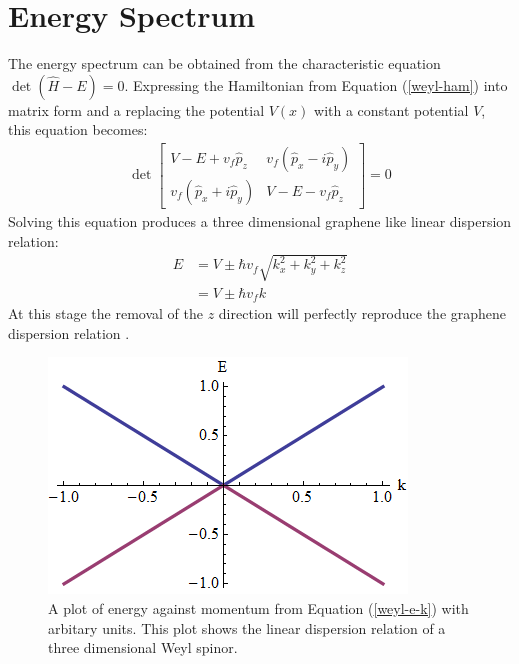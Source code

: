 		\section{Energy Spectrum}
			The energy spectrum can be obtained from the characteristic equation $\det\left(\hat{H}-E\right)=0$. Expressing the Hamiltonian from Equation (\ref{weyl-ham}) into matrix form and a replacing the potential $V\left( x\right)$ with a constant potential $V$, this equation becomes:
			\begin{align}
				\det
				\left[\begin{array}{ccc}
				V-E+v_{f}\hat{p}_{z}&v_{f}\left(\hat{p}_{x}-i\hat{p}_{y}\right)\\
				v_{f}\left(\hat{p}_{x}+i\hat{p}_{y}\right)&V-E-v_{f}\hat{p}_{z}
				\end{array}\right]
				=0
			\end{align}
			Solving this equation produces a three dimensional graphene like linear dispersion relation:
			\begin{align}
				E&=V\pm \hbar v_{f}\sqrt{k_{x}^{2}+k_{y}^{2}+k_{z}^{2}}
				\\
				&=V\pm \hbar v_{f}k
				\label{weyl-e-k}
			\end{align}
			At this stage the removal of the $z$ direction will perfectly reproduce the graphene dispersion relation \cite{b5}.
		\begin{figure}[h]
			\centerline{\includegraphics[scale=0.7]{images/weyl-ek}}
			\caption{A plot of energy against momentum from Equation (\ref{weyl-e-k}) with arbitary units. This plot shows the linear dispersion relation of a three dimensional Weyl spinor.}
			\label{}
		\end{figure}

